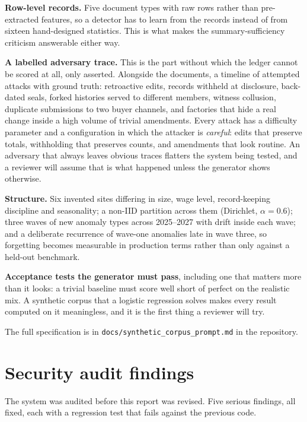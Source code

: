 \textbf{Row-level records.} Five document types with raw rows rather than
pre-extracted features, so a detector has to learn from the records instead of
from sixteen hand-designed statistics. This is what makes the summary-sufficiency
criticism answerable either way.

\textbf{A labelled adversary trace.} This is the part without which the ledger
cannot be scored at all, only asserted. Alongside the documents, a timeline of
attempted attacks with ground truth: retroactive edits, records withheld at
disclosure, back-dated seals, forked histories served to different members,
witness collusion, duplicate submissions to two buyer channels, and factories that
hide a real change inside a high volume of trivial amendments. Every attack has a
difficulty parameter and a configuration in which the attacker is \emph{careful}:
edits that preserve totals, withholding that preserves counts, and amendments that
look routine. An adversary that always leaves obvious traces flatters the system
being tested, and a reviewer will assume that is what happened unless the
generator shows otherwise.

\textbf{Structure.} Six invented sites differing in size, wage level,
record-keeping discipline and seasonality; a non-IID partition across them
(Dirichlet, $\alpha = 0.6$); three waves of new anomaly types across 2025--2027
with drift inside each wave; and a deliberate recurrence of wave-one anomalies
late in wave three, so forgetting becomes measurable in production terms rather
than only against a held-out benchmark.

\textbf{Acceptance tests the generator must pass}, including one that matters more
than it looks: a trivial baseline must score well short of perfect on the
realistic mix. A synthetic corpus that a logistic regression solves makes every
result computed on it meaningless, and it is the first thing a reviewer will try.

The full specification is in \texttt{docs/synthetic\_corpus\_prompt.md} in the
repository.

\section{Security audit findings}

The system was audited before this report was revised. Five serious findings, all
fixed, each with a regression test that fails against the previous code.

